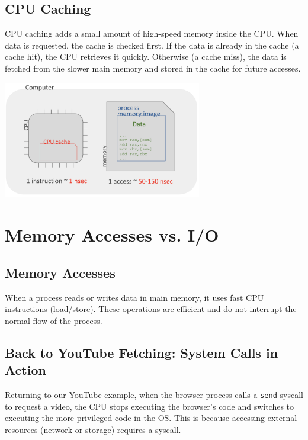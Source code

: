 \subsection{CPU Caching}
CPU caching adds a small amount of high-speed memory inside the CPU. When data is requested, the cache is checked first. If the data is already in the cache (a cache hit), the CPU retrieves it quickly. Otherwise (a cache miss), the data is fetched from the slower main memory and stored in the cache for future accesses.

\begin{center}
  \includegraphics[width=0.65\textwidth]{chapters/L1/images/cache.png}
\end{center}

\section{Memory Accesses vs. I/O}

\subsection{Memory Accesses}
When a process reads or writes data in main memory, it uses fast CPU instructions (load/store). These operations are efficient and do not interrupt the normal flow of the process.

\subsection{Back to YouTube Fetching: System Calls in Action}

Returning to our YouTube example, when the browser process calls a \texttt{send} syscall to request a video, the CPU stops executing the browser’s code and switches to executing the more privileged code in the OS. This is because accessing external resources (network or storage) requires a syscall.

